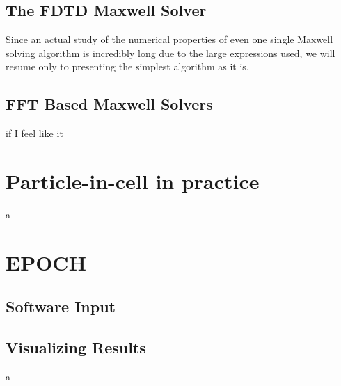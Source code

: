 \documentclass[12pt, class=report, crop=false]{standalone}
\begin{document}
\subsection{The FDTD Maxwell Solver}
Since an actual study of the numerical properties of even one single Maxwell solving algorithm is incredibly long due to the large expressions used, we will resume only to presenting the simplest algorithm as it is.

\subsection{FFT Based Maxwell Solvers}
if I feel like it

\section{Particle-in-cell in practice}
a

\section{EPOCH}
\subsection{Software Input}
\subsection{Visualizing Results}
a
\end{document}

